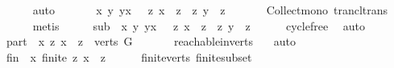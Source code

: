 \begin{isabellebody}
\ \ \ \ \isamarkupfalse%
\ auto\ \ \isanewline
\ \ \isamarkupfalse%
\ {\isachardoublequoteopen}{\isasymforall}\ x\ y{\isachardot}{\kern0pt}\ y{\isasymrightarrow}\isactrlsup {\isacharplus}{\kern0pt}x\ {\isasymlongrightarrow}\ \ {\isacharbraceleft}{\kern0pt}z{\isachardot}{\kern0pt}\ x\ {\isasymrightarrow}\isactrlsup {\isacharplus}{\kern0pt}\ z{\isacharbraceright}{\kern0pt}\ {\isasymsubseteq}\ {\isacharbraceleft}{\kern0pt}z{\isachardot}{\kern0pt}\ y\ {\isasymrightarrow}\isactrlsup {\isacharplus}{\kern0pt}\ z{\isacharbraceright}{\kern0pt}{\isachardoublequoteclose}\isanewline
\ \ \ \ \isamarkupfalse%
\ \ Collect{\isacharunderscore}{\kern0pt}mono\ trancl{\isacharunderscore}{\kern0pt}trans\isanewline
\ \ \ \ \isamarkupfalse%
\ metis\isanewline
\ \ \isamarkupfalse%
\ \isamarkupfalse%
\ sub{\isacharcolon}{\kern0pt}\ {\isachardoublequoteopen}{\isasymforall}\ x\ y{\isachardot}{\kern0pt}\ y{\isasymrightarrow}\isactrlsup {\isacharplus}{\kern0pt}x\ {\isasymlongrightarrow}\ \ {\isacharbraceleft}{\kern0pt}z{\isachardot}{\kern0pt}\ x\ {\isasymrightarrow}\isactrlsup {\isacharplus}{\kern0pt}\ z{\isacharbraceright}{\kern0pt}\ {\isasymsubset}\ {\isacharbraceleft}{\kern0pt}z{\isachardot}{\kern0pt}\ y\ {\isasymrightarrow}\isactrlsup {\isacharplus}{\kern0pt}\ z{\isacharbraceright}{\kern0pt}{\isachardoublequoteclose}\isanewline
\ \ \ \ \isamarkupfalse%
\ cycle{\isacharunderscore}{\kern0pt}free\ \isamarkupfalse%
\ auto\isanewline
\ \ \isamarkupfalse%
\ part{\isacharcolon}{\kern0pt}\ {\isachardoublequoteopen}{\isasymforall}\ x{\isachardot}{\kern0pt}\ {\isacharbraceleft}{\kern0pt}z{\isachardot}{\kern0pt}\ x\ {\isasymrightarrow}\isactrlsup {\isacharplus}{\kern0pt}\ z{\isacharbraceright}{\kern0pt}\ {\isasymsubseteq}\ verts\ G{\isachardoublequoteclose}\ \isanewline
\ \ \ \ \isamarkupfalse%
\ reachable{}{\isacharunderscore}{\kern0pt}in{\isacharunderscore}{\kern0pt}verts\ \ \isamarkupfalse%
\ auto\isanewline
\ \ \isamarkupfalse%
\ \isamarkupfalse%
\ fin{\isacharcolon}{\kern0pt}\ {\isachardoublequoteopen}{\isasymforall}\ x{\isachardot}{\kern0pt}\ finite\ {\isacharbraceleft}{\kern0pt}z{\isachardot}{\kern0pt}\ x\ {\isasymrightarrow}\isactrlsup {\isacharplus}{\kern0pt}\ z{\isacharbraceright}{\kern0pt}{\isachardoublequoteclose}\isanewline
\ \ \ \ \isamarkupfalse%
\ finite{\isacharunderscore}{\kern0pt}verts\ finite{\isacharunderscore}{\kern0pt}subset\isanewline

\end{isabellebody}
